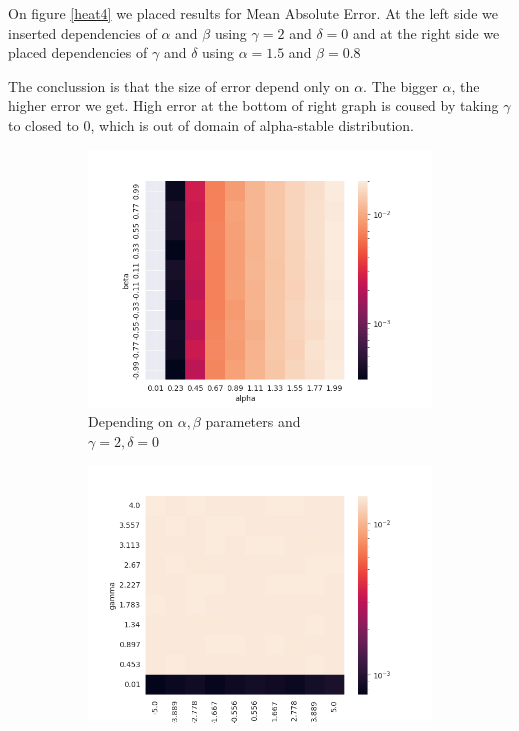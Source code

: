 \documentclass{article}
\begin{document}
		On figure \ref{heat4} we placed results for Mean Absolute Error. At the left side we inserted dependencies of $\alpha$ and $\beta$ using $\gamma=2$ and $\delta=0$ and at the right side we placed dependencies of $\gamma$ and $\delta$ using $\alpha=1.5$ and $\beta=0.8$

		The conclussion is that the size of error depend only on $\alpha$. The bigger $\alpha$, the higher error we get. High error at the bottom of right graph is coused by taking $\gamma$ to closed to 0, which is out of domain of alpha-stable distribution.

		\begin{figure}[H]
			\begin{subfigure}{.5\textwidth}
				\centering
				\includegraphics[width=1\linewidth]{images/heatmap_cf_MAE_alpha_beta.png}
				\caption{Depending on $\alpha, \beta$ parameters and \\$\gamma = 2, \delta = 0$}
			\end{subfigure}
			\begin{subfigure}[r]{.5\textwidth}
				\centering
				\includegraphics[width=1\linewidth]{images/heatmap_cf_MAE_gamma_delta.png}

\end{subfigure}
\end{figure}
\end{document}
